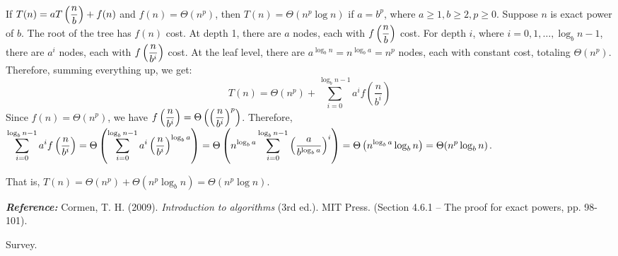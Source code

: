 \documentclass[answers]{exam}
\begin{document}
\begin{questions}
\begin{psol}{If $\displaystyle T(n)=aT\left(\frac{n}{b}\right)+f(n)$ and $f(n)=\Theta(n^p)$, then $T(n)=\Theta(n^p\log n)$ if $a=b^p$, where $a\geq 1, b\geq 2, p\geq 0$. Suppose $n$ is exact power of $b$.}
        The root of the tree has $f(n)$ cost.
        At depth 1, there are $a$ nodes, each with $\displaystyle f\left(\frac{n}{b}\right)$ cost.
        For depth $i$, where $i=0,1,\ldots,\log_b n-1$, there are $a^i$ nodes, each with $\displaystyle f\left(\frac{n}{b^i}\right)$ cost.
        At the leaf level, there are $a^{\log_b n}=n^{\log_b a}=n^p$ nodes, each with constant cost, totaling $\Theta(n^p)$.
        Therefore, summing everything up, we get:
        \[T(n)=\Theta(n^p)+\sum_{i=0}^{\log_b n-1} a^i f\left(\frac{n}{b^i}\right)\]
        Since $f(n)=\Theta(n^p)$, we have $\displaystyle f\left(\frac{n}{b^i}\right)=\Theta\left(\left(\frac{n}{b^i}\right)^p\right)$.
        Therefore, $\displaystyle\sum_{i=0}^{\log_b n-1} a^i f\left(\frac{n}{b^i}\right)=\Theta\left(\sum_{i=0}^{\log_b n-1}a^i\left(\frac{n}{b^i}\right)^{\log_b a}\right)=\Theta\left(n^{\log_b a}\sum_{i=0}^{\log_b n-1}\left(\frac{a}{b^{\log_b a}}\right)^i\right)=\Theta\left(n^{\log_b a}\log_b n\right)=\Theta(n^p\log_b n)$.

        That is, $T(n)=\Theta(n^p)+\Theta(n^p\log_b n)=\Theta(n^p\log n)$.

        \textit{\bfseries Reference:} Cormen, T. H. (2009). \textit{Introduction to algorithms} (3rd ed.). MIT Press. (Section 4.6.1 -- The proof for exact powers, pp. 98-101).
    \end{psol}

    \question[5] Survey.
    \begin{solution}
    \end{solution}

\end{questions}
\end{document}
